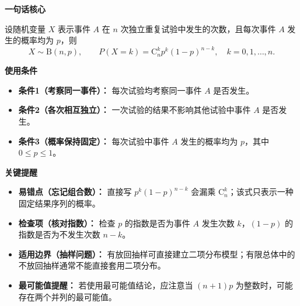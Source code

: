 \begin{summarybox}
	\textbf{\textcolor{CSummary}{一句话核心}}

	设随机变量 $X$ 表示事件 $A$ 在 $n$ 次独立重复试验中发生的次数，且每次事件 $A$ 发生的概率均为 $p$，则
	\[
		X\sim \mathrm{B}(n,p), \qquad
		P(X=k)=\mathrm{C}_n^k p^k(1-p)^{n-k},
		\quad k=0,1,\dots,n.
	\]

	\medskip
	\textbf{\textcolor{CSummary}{使用条件}}
	\begin{itemize}[leftmargin=*, itemsep=0.5em, topsep=0.4em]
		\item \textbf{条件1（考察同一事件）：} 每次试验均考察同一事件 $A$ 是否发生。
		\item \textbf{条件2（各次相互独立）：} 一次试验的结果不影响其他试验中事件 $A$ 是否发生。
		\item \textbf{条件3（概率保持固定）：} 每次试验中事件 $A$ 发生的概率均为 $p$，其中 $0\le p\le 1$。
	\end{itemize}

	\medskip
	\textbf{\textcolor{CSummary}{关键提醒}}
	\begin{itemize}[leftmargin=*, itemsep=0.5em, topsep=0.4em]
		\item \textbf{易错点（忘记组合数）：} 直接写 $p^k(1-p)^{n-k}$ 会漏乘 $\mathrm{C}_n^k$；该式只表示一种固定结果序列的概率。
		\item \textbf{检查项（核对指数）：} 检查 $p$ 的指数是否为事件 $A$ 发生次数 $k$，$(1-p)$ 的指数是否为不发生次数 $n-k$。
		\item \textbf{适用边界（抽样问题）：} 有放回抽样可直接建立二项分布模型；有限总体中的不放回抽样通常不能直接套用二项分布。
		\item \textbf{最可能值提醒：} 若使用最可能值结论，应注意当 $(n+1)p$ 为整数时，可能存在两个并列的最可能值。
	\end{itemize}
\end{summarybox}